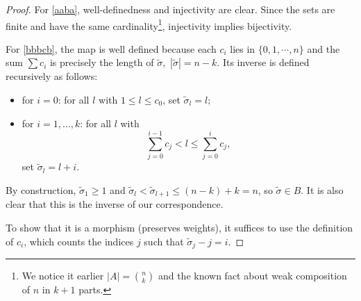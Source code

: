 \documentclass[10pt,a4paper]{amsart}
\newcommand{\coss}{\cdots}
\begin{document}
\begin{proof}
	For \ref{aaba}, well-definedness and injectivity are clear. Since the sets are finite and have the same cardinality\footnote{We notice it earlier $|A|=\binom{n}{k}$  and the known fact about weak composition of $n$ in $k+1$ parts.}, injectivity implies bijectivity.
	
	For \ref{bbbcb}, the map is well defined because each $c_i$ lies in $\{0,1,\coss,n\}$ and the sum $\sum c_i$ is precisely the length of $\tilde{\sigma},$ $|\tilde{\sigma}|=n-k$. Its inverse is defined recursively as follows:
	\begin{itemize}
		\item for $i=0$: for all $l$ with $1\leq l\leq c_0$, set $\tilde{\sigma}_l=l$;
		\item for $i=1,\dots,k$: for all $l$ with
		\[
		\sum_{j=0}^{i-1}c_j< l\leq \sum_{j=0}^{i} c_j,
		\]
		set $\tilde{\sigma}_l=l+i$.
	\end{itemize}
	By construction, $\tilde{\sigma}_1\geq 1$ and $\tilde{\sigma}_l<\tilde{\sigma}_{l+1}\leq (n-k)+k=n$, so $\tilde{\sigma}\in B$. It is also clear that this is the inverse of our correspondence.
	
	To show that it is a morphism (preserves weights), it suffices to use the definition of $c_i$, which counts the indices $j$ such that $\tilde{\sigma}_j-j=i$. %
\end{proof}
\end{document}
